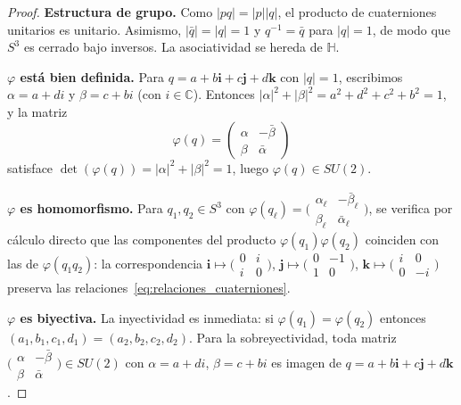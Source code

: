 \begin{proof}
\textbf{Estructura de grupo.} Como $|pq| = |p||q|$, el producto de cuaterniones unitarios es unitario. Asimismo, $|\bar{q}| = |q| = 1$ y $q^{-1} = \bar{q}$ para $|q| = 1$, de modo que $S^3$ es cerrado bajo inversos. La asociatividad se hereda de $\mathbb{H}$.

\textbf{$\varphi$ está bien definida.} Para $q = a + b\mathbf{i} + c\mathbf{j} + d\mathbf{k}$ con $|q| = 1$, escribimos $\alpha = a + di$ y $\beta = c + bi$ (con $i \in \mathbb{C}$). Entonces $|\alpha|^2 + |\beta|^2 = a^2 + d^2 + c^2 + b^2 = 1$, y la matriz
\[
\varphi(q) = \begin{pmatrix} \alpha & -\bar{\beta} \\ \beta & \bar{\alpha} \end{pmatrix}
\]
satisface $\det(\varphi(q)) = |\alpha|^2 + |\beta|^2 = 1$, luego $\varphi(q) \in SU(2)$.

\textbf{$\varphi$ es homomorfismo.} Para $q_1, q_2 \in S^3$ con $\varphi(q_\ell) = \bigl(\begin{smallmatrix} \alpha_\ell & -\bar{\beta}_\ell \\ \beta_\ell & \bar{\alpha}_\ell \end{smallmatrix}\bigr)$, se verifica por cálculo directo que las componentes del producto $\varphi(q_1)\varphi(q_2)$ coinciden con las de $\varphi(q_1 q_2)$: la correspondencia $\mathbf{i} \mapsto \bigl(\begin{smallmatrix} 0 & i \\ i & 0 \end{smallmatrix}\bigr)$, $\mathbf{j} \mapsto \bigl(\begin{smallmatrix} 0 & -1 \\ 1 & 0 \end{smallmatrix}\bigr)$, $\mathbf{k} \mapsto \bigl(\begin{smallmatrix} i & 0 \\ 0 & -i \end{smallmatrix}\bigr)$ preserva las relaciones~\eqref{eq:relaciones_cuaterniones}.

\textbf{$\varphi$ es biyectiva.} La inyectividad es inmediata: si $\varphi(q_1) = \varphi(q_2)$ entonces $(a_1, b_1, c_1, d_1) = (a_2, b_2, c_2, d_2)$. Para la sobreyectividad, toda matriz $\bigl(\begin{smallmatrix} \alpha & -\bar{\beta} \\ \beta & \bar{\alpha} \end{smallmatrix}\bigr) \in SU(2)$ con $\alpha = a + di$, $\beta = c + bi$ es imagen de $q = a + b\mathbf{i} + c\mathbf{j} + d\mathbf{k}$.
\end{proof}

